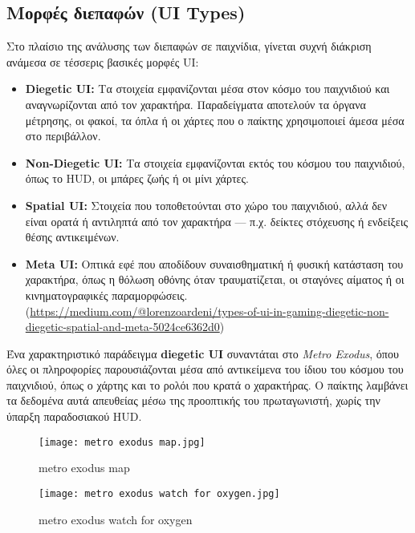 \subsection*{Μορφές διεπαφών (UI Types)}
Στο πλαίσιο της ανάλυσης των διεπαφών σε παιχνίδια, γίνεται συχνή διάκριση ανάμεσα σε τέσσερις βασικές μορφές UI:

\begin{itemize}
  \item \textbf{Diegetic UI:} Τα στοιχεία εμφανίζονται μέσα στον κόσμο του παιχνιδιού και αναγνωρίζονται από τον χαρακτήρα. Παραδείγματα αποτελούν τα όργανα μέτρησης, οι φακοί, τα όπλα ή οι χάρτες που ο παίκτης χρησιμοποιεί άμεσα μέσα στο περιβάλλον.
  \item \textbf{Non-Diegetic UI:} Τα στοιχεία εμφανίζονται εκτός του κόσμου του παιχνιδιού, όπως το HUD, οι μπάρες ζωής ή οι μίνι χάρτες.
  \item \textbf{Spatial UI:} Στοιχεία που τοποθετούνται στο χώρο του παιχνιδιού, αλλά δεν είναι ορατά ή αντιληπτά από τον χαρακτήρα — π.χ. δείκτες στόχευσης ή ενδείξεις θέσης αντικειμένων.
  \item \textbf{Meta UI:} Οπτικά εφέ που αποδίδουν συναισθηματική ή φυσική κατάσταση του χαρακτήρα, όπως η θόλωση οθόνης όταν τραυματίζεται, οι σταγόνες αίματος ή οι κινηματογραφικές παραμορφώσεις. (\href{https://medium.com/@lorenzoardeni/types-of-ui-in-gaming-diegetic-non-diegetic-spatial-and-meta-5024ce6362d0}{https://medium.com/@lorenzoardeni/types-of-ui-in-gaming-diegetic-non-diegetic-spatial-and-meta-5024ce6362d0})
\end{itemize}


Ένα χαρακτηριστικό παράδειγμα \textbf{diegetic UI} συναντάται στο \textit{Metro Exodus}, όπου όλες οι πληροφορίες παρουσιάζονται μέσα από αντικείμενα του ίδιου του κόσμου του παιχνιδιού, όπως ο χάρτης και το ρολόι που κρατά ο χαρακτήρας. Ο παίκτης λαμβάνει τα δεδομένα αυτά απευθείας μέσω της προοπτικής του πρωταγωνιστή, χωρίς την ύπαρξη παραδοσιακού HUD.

\begin{figure}[H]
    \centering
    \texttt{[image: metro exodus map.jpg]}
    \caption{metro exodus map}
    \label{fig:placeholder}
\end{figure}
\begin{figure}[H]
    \centering
    \texttt{[image: metro exodus watch for oxygen.jpg]}
    \caption{metro exodus watch for oxygen}
    \label{fig:placeholder}
\end{figure}

